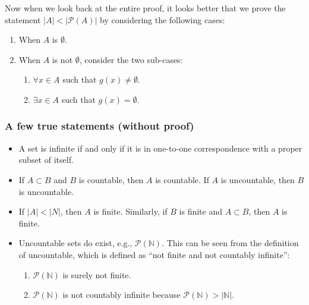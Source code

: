 \documentclass[12pt, letterpaper, oneside]{book}
\begin{document}
Now when we look back at the entire proof, it looks better that we prove the
statement $|A| < |\mathcal{P}(A)|$ by considering the following cases:
\begin{enumerate}
  \item When $A$ is $\emptyset$.
  \item When $A$ is not $\emptyset$, consider the two sub-cases:
        \begin{enumerate}
          \item $\forall x \in A$ such that $g(x) \neq \emptyset$.
          \item $\exists x \in A$ such that $g(x) = \emptyset$.
        \end{enumerate}
\end{enumerate}

\subsubsection{A few true statements (without proof)}

\begin{itemize}
  \item A set is infinite if and only if it is in one-to-one correspondence
        with a proper subset of itself.
  \item If $A \subset B$ and $B$ is countable, then $A$ is countable. If $A$ is
        uncountable, then $B$ is uncountable.
  \item If $|A| < |N|$, then $A$ is finite. Similarly, if $B$ is finite and $A
          \subset B$, then $A$ is finite.
  \item Uncountable sets do exist, e.g., $\mathcal{P}(\mathbb{N})$. This can be
        seen from the definition of uncountable, which is defined as ``not finite
        and not countably infinite'':
        \begin{enumerate}
          \item $\mathcal{P}(\mathbb{N})$ is surely not finite.
          \item $\mathcal{P}(\mathbb{N})$ is not countably infinite because
                $\mathcal{P}(\mathbb{N}) > |\mathbb{N}|$.
        \end{enumerate}
\end{itemize}

%
%
\end{document}
